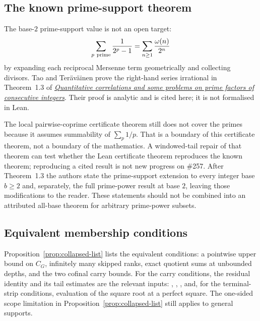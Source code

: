 \subsection{The known prime-support theorem}
\label{ssec:route-3}

The base-$2$ prime-support value is not an open target:
\[
  \sum_{p\ {\rm prime}}\frac1{2^p-1}
  =\sum_{n\ge1}\frac{\omega(n)}{2^n}
\]
by expanding each reciprocal Mersenne term geometrically and collecting
divisors.  Tao and Ter\"av\"ainen prove the right-hand series irrational in
Theorem~1.3 of
\href{https://arxiv.org/abs/2512.01739}{\emph{Quantitative correlations and
some problems on prime factors of consecutive integers}}.  Their proof is
analytic and is cited here; it is not formalised in Lean.

The local pairwise-coprime certificate theorem still does not cover the
primes because it assumes summability of $\sum_p1/p$.  That is a boundary of
this certificate theorem, not a boundary of the mathematics.  A
windowed-tail repair of that theorem can test whether the Lean
certificate theorem reproduces the known theorem; reproducing a cited
result is not new progress on \#257.  After Theorem~1.3 the authors state the
prime-support extension to every integer base $b\ge2$ and, separately,
the full prime-power result at base $2$, leaving those modifications to
the reader.  These statements should not be combined into an attributed
all-base theorem for arbitrary prime-power subsets.

\subsection{Equivalent membership conditions}
\label{ssec:route-4}

Proposition~\ref{prop:collapsed-list} lists the equivalent conditions:
a pointwise upper bound on $C_G$, infinitely many skipped ranks, exact
quotient sums at unbounded depths, and the two cofinal carry bounds.
For the carry conditions, the residual identity and its tail estimates are
the relevant inputs:
,
,
, and, for the terminal-strip conditions, evaluation of the square root at
a perfect square.  The one-sided scope limitation in
Proposition~\ref{prop:collapsed-list} still applies to general supports.

